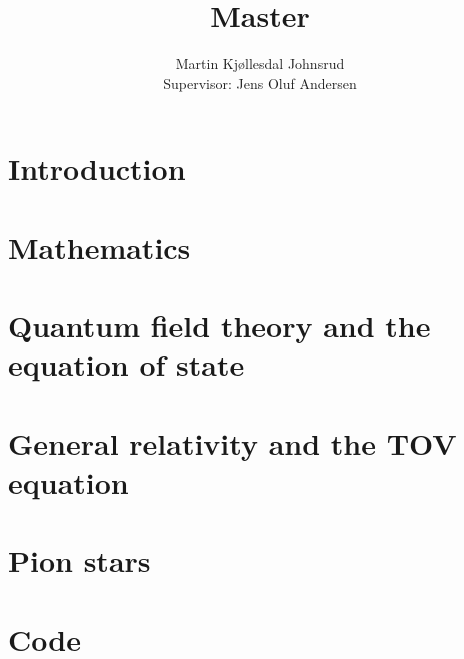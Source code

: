 \documentclass{book}
\title{\huge{Master}}
\author{
    \large{Martin Kjøllesdal Johnsrud }\\
    \normalsize{Supervisor: Jens Oluf Andersen}
    }
\begin{document}
    \maketitle
    \listoftodos
    \clearpage
    \tableofcontents
   
    \setlength{\parindent}{0em}
    \setlength{\parskip}{0.8em}

    \chapter{Introduction}
    \label{chapter: introduction}
    


    \chapter{Mathematics}
    \label{chapter: math}
    
    


    \chapter{Quantum field theory and the equation of state}
    
    
    
    

    \chapter{General relativity and the TOV equation}
    \label{chapter: GR}
    
    
    

    \chapter{Pion stars}
    \label{chapter: pion stars}
    

    \appendix

    \chapter[Appendix A]{}
    
    
    \chapter{Code}
    

    \printbibliography
\end{document}
